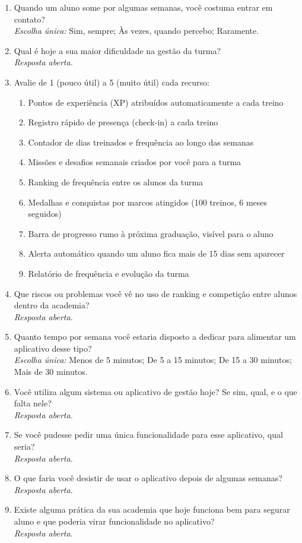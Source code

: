 \begin{enumerate}[leftmargin=*, itemsep=1pt, parsep=0pt]
        {\footnotesize\textit{Resposta aberta.}}
  \item Quando um aluno some por algumas semanas, você costuma entrar em contato?\\
        {\footnotesize\textit{Escolha única:} Sim, sempre; Às vezes, quando percebo; Raramente.}
  \item Qual é hoje a sua maior dificuldade na gestão da turma?\\
        {\footnotesize\textit{Resposta aberta.}}
  \item Avalie de 1 (pouco útil) a 5 (muito útil) cada recurso:
  \begin{enumerate}[label=\alph*)]
    \item Pontos de experiência (XP) atribuídos automaticamente a cada treino
    \item Registro rápido de presença (check-in) a cada treino
    \item Contador de dias treinados e frequência ao longo das semanas
    \item Missões e desafios semanais criados por você para a turma
    \item Ranking de frequência entre os alunos da turma
    \item Medalhas e conquistas por marcos atingidos (100 treinos, 6 meses seguidos)
    \item Barra de progresso rumo à próxima graduação, visível para o aluno
    \item Alerta automático quando um aluno fica mais de 15 dias sem aparecer
    \item Relatório de frequência e evolução da turma
  \end{enumerate}
  \item Que riscos ou problemas você vê no uso de ranking e competição entre alunos dentro da academia?\\
        {\footnotesize\textit{Resposta aberta.}}
  \item Quanto tempo por semana você estaria disposto a dedicar para alimentar um aplicativo desse tipo?\\
        {\footnotesize\textit{Escolha única:} Menos de 5 minutos; De 5 a 15 minutos; De 15 a 30 minutos; Mais de 30 minutos.}
  \item Você utiliza algum sistema ou aplicativo de gestão hoje? Se sim, qual, e o que falta nele?\\
        {\footnotesize\textit{Resposta aberta.}}
  \item Se você pudesse pedir uma única funcionalidade para esse aplicativo, qual seria?\\
        {\footnotesize\textit{Resposta aberta.}}
  \item O que faria você desistir de usar o aplicativo depois de algumas semanas?\\
        {\footnotesize\textit{Resposta aberta.}}
  \item Existe alguma prática da sua academia que hoje funciona bem para segurar aluno e que poderia virar funcionalidade no aplicativo?\\
        {\footnotesize\textit{Resposta aberta.}}
\end{enumerate}

